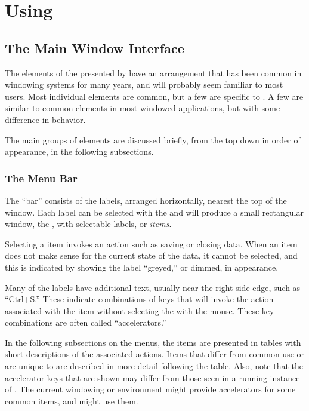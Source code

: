 \chapter{Using \dtypkgu{}}

	\section{The Main Window Interface}%
	The elements of the  presented by \IXpkg{}
	have an arrangement that has been common in
	windowing systems for many years, and will probably
	seem familiar to most users. Most individual elements are common,
	but a few are specific to \IXpkg{}. A few are similar
	to common elements in most windowed applications,
	but with some difference in behavior.

	The main groups of  elements are
	discussed briefly, from the top down in order of appearance,
	in the following subsections.
		\subsection{The Menu Bar}%
		The  ``bar'' consists of the labels, arranged
		horizontally, nearest the top of the window. Each
		label can be selected with the  and
		will produce a small rectangular window, the
		, with selectable labels, or
		\emph{items}.
		
		Selecting a  item invokes an action
		such as saving or closing data. When an item does not
		make sense for the current state of the data, it
		cannot be selected, and this is indicated by showing the
		label ``greyed,'' or dimmed, in appearance.
		
		Many of the  labels have additional text,
		usually near the right-side edge, such as ``Ctrl+S.''  These
		indicate combinations of keys that will invoke the
		action associated with the  item without
		selecting the  with the mouse. These
		key combinations are often called ``accelerators.''
		
		In the following subsections on the menus, the 
		items are presented in tables with short descriptions of
		the associated actions. Items that differ from
		common use or are unique to \IXpkg{} are described in
		more detail following the table.
		Also, note that the accelerator keys that are shown
		may differ from those seen in a running instance of
		\IXpkg{}. The current windowing  or environment
		might provide accelerators for some common 
		items, and \IXpkg{} might use them.

